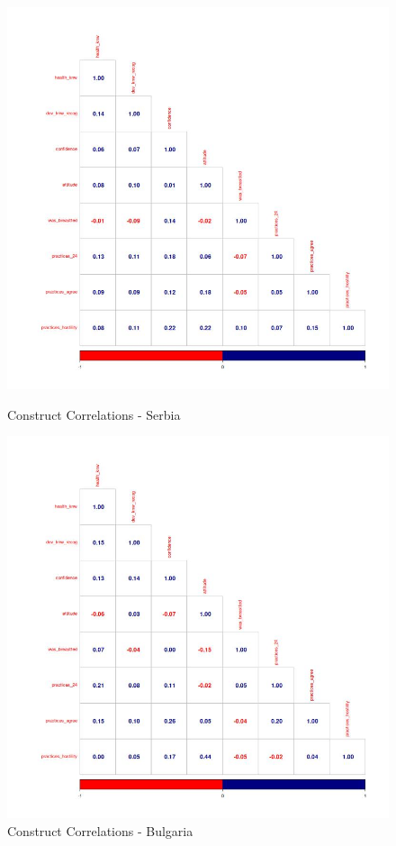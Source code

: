 \documentclass{article}
\begin{document}
\begin{figure}[H]
\begin{minipage}{.5\textwidth}
    \centering
    \includegraphics[scale=0.33]{descriptives/plots/correlations_constructs_Serbia_Baseline.jpg}
    \caption{Construct Correlations - Serbia}
    \label{fig:serbia correlations}
\end{minipage}%
\begin{minipage}{.5\textwidth}
    \includegraphics[scale=0.33]{descriptives/plots/correlations_constructs_Bulgaria_Baseline.jpg}
    \caption{Construct Correlations - Bulgaria}
    \label{fig:bulgaria correlations}
\end{minipage}%
\end{figure}
\end{document}
